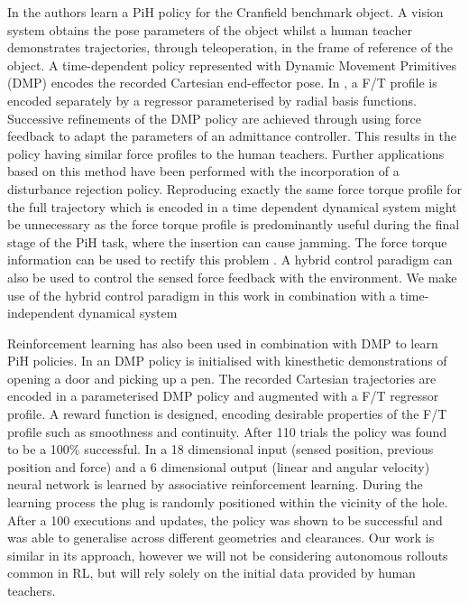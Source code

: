 \documentclass[final,3p,times,twocolumn]{elsarticle}
\begin{document}
In \cite{fast_peg_pbd_icmc_2014} the authors learn a PiH policy for the Cranfield benchmark object.
A vision system obtains the pose parameters of the object whilst a human teacher  
demonstrates trajectories, through teleoperation, in the frame of reference of the object. 
A time-dependent policy represented with Dynamic Movement Primitives (DMP) \cite{Schaal04learningmovement} 
encodes the recorded Cartesian end-effector pose. In \cite{trans_workpiece_icra_2013}, a F/T profile 
is encoded separately by a regressor parameterised by radial basis functions. Successive refinements of the DMP policy are achieved through 
using force feedback to adapt the parameters of an admittance controller. This results in the policy having
similar force profiles to the human teachers. Further applications based on this method have been 
performed \cite{sol_pdg_pbd_2014} with the incorporation of a disturbance rejection policy. Reproducing exactly 
the same force torque profile for the full trajectory which is encoded in a time dependent dynamical system might be unnecessary as the force torque profile is 
predominantly useful during the final stage of the PiH task, where the insertion can cause jamming. 
The force torque information can be used to rectify this problem \cite[Chap. 5]{Kronander2015}. A 
hybrid control paradigm \cite{hybrid_1992} can also be used to control the sensed force feedback with the environment.
We make use of the hybrid control paradigm in this work in combination with a time-independent dynamical system

Reinforcement learning has also been used in combination with DMP to learn PiH policies. In \cite{learn_force_c_icirs_2011}
an DMP policy is initialised with kinesthetic demonstrations of opening a door and picking up a pen. The recorded Cartesian 
trajectories are encoded in a parameterised DMP policy and augmented with a F/T regressor profile. A reward function is designed, 
encoding desirable properties of the F/T profile such as smoothness and continuity. After 110 trials the policy
was found to be a 100\% successful. In \cite{learn_admittance_icra_1994} a 18 dimensional input (sensed position, previous position and force) 
and a 6 dimensional output (linear and angular velocity) neural network is learned by associative reinforcement learning. 
During the learning process the plug is randomly positioned within the vicinity of the hole. After a 100 executions and 
updates, the policy was shown to be successful and was able to generalise across different geometries and clearances.
Our work is similar in its approach, however we will not be considering autonomous rollouts common 
in RL, but will rely solely on the initial data provided by human teachers.
\end{document}
